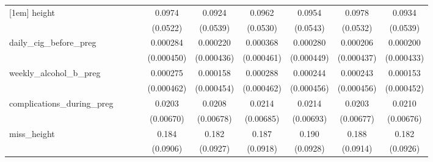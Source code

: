 \begin{table}[htbp]
\begin{tabular}{l*{9}{c}}
[1em]
height      &                     &                     &                     &      0.0974\sym{*}  &      0.0924\sym{*}  &      0.0962\sym{*}  &      0.0954\sym{*}  &      0.0978\sym{*}  &      0.0934\sym{*}  \\
            &                     &                     &                     &    (0.0522)         &    (0.0539)         &    (0.0530)         &    (0.0543)         &    (0.0532)         &    (0.0539)         \\
[1em]
daily\_cig\_before\_preg&                     &                     &                     &    0.000284         &    0.000220         &    0.000368         &    0.000280         &    0.000206         &    0.000200         \\
            &                     &                     &                     &  (0.000450)         &  (0.000436)         &  (0.000461)         &  (0.000449)         &  (0.000437)         &  (0.000433)         \\
[1em]
weekly\_alcohol\_b\_preg&                     &                     &                     &    0.000275         &    0.000158         &    0.000288         &    0.000244         &    0.000243         &    0.000153         \\
            &                     &                     &                     &  (0.000462)         &  (0.000454)         &  (0.000462)         &  (0.000456)         &  (0.000456)         &  (0.000452)         \\
[1em]
complications\_during\_preg&                     &                     &                     &      0.0203\sym{***}&      0.0208\sym{***}&      0.0214\sym{***}&      0.0214\sym{***}&      0.0203\sym{***}&      0.0210\sym{***}\\
            &                     &                     &                     &   (0.00670)         &   (0.00678)         &   (0.00685)         &   (0.00693)         &   (0.00677)         &   (0.00676)         \\
[1em]
miss\_height &                     &                     &                     &       0.184\sym{**} &       0.182\sym{**} &       0.187\sym{**} &       0.190\sym{**} &       0.188\sym{**} &       0.182\sym{**} \\
            &                     &                     &                     &    (0.0906)         &    (0.0927)         &    (0.0918)         &    (0.0928)         &    (0.0914)         &    (0.0926)         \\

\end{tabular}
\end{table}

